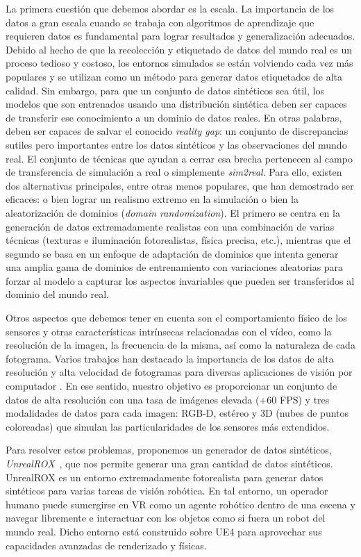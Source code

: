 La primera cuestión que debemos abordar es la escala. La importancia de los datos a gran escala cuando se trabaja con algoritmos de aprendizaje que requieren datos es fundamental para lograr resultados y generalización adecuados. Debido al hecho de que la recolección y etiquetado de datos del mundo real es un proceso tedioso y costoso, los entornos simulados se están volviendo cada vez más populares y se utilizan como un método para generar datos etiquetados de alta calidad. Sin embargo, para que un conjunto de datos sintéticos sea útil, los modelos que son entrenados usando una distribución sintética deben ser capaces de transferir ese conocimiento a un dominio de datos reales. En otras palabras, deben ser capaces de salvar el conocido \emph{reality gap}: un conjunto de discrepancias sutiles pero importantes entre los datos sintéticos y las observaciones del mundo real. El conjunto de técnicas que ayudan a cerrar esa brecha pertenecen al campo de transferencia de simulación a real o simplemente \emph{sim2real}. Para ello, existen dos alternativas principales, entre otras menos populares, que han demostrado ser eficaces: o bien lograr un realismo extremo en la simulación o bien la aleatorización de dominios (\emph{domain randomization}). El primero se centra en la generación de datos extremadamente realistas con una combinación de varias técnicas (texturas e iluminación fotorealistas, física precisa, etc.), mientras que el segundo se basa en un enfoque de adaptación de dominios que intenta generar una amplia gama de dominios de entrenamiento con variaciones aleatorias para forzar al modelo a capturar los aspectos invariables que pueden ser transferidos al dominio del mundo real. 

Otros aspectos que debemos tener en cuenta son el comportamiento físico de los sensores y otras características intrínsecas relacionadas con el vídeo, como la resolución de la imagen, la frecuencia de la misma, así como la naturaleza de cada fotograma. Varios trabajos han destacado la importancia de los datos de alta resolución y alta velocidad de fotogramas para diversas aplicaciones de visión por computador \cite{Handa2012}\cite{Held2016}. En ese sentido, nuestro objetivo es proporcionar un conjunto de datos de alta resolución con una tasa de imágenes elevada (+60 FPS) y tres modalidades de datos para cada imagen: RGB-D, estéreo y 3D (nubes de puntos coloreadas) que simulan las particularidades de los sensores más extendidos.

Para resolver estos problemas, proponemos un generador de datos sintéticos, \emph{UnrealROX}~\cite{Martinez-Gonzalez2018}, que nos permite generar una gran cantidad de datos sintéticos. UnrealROX es un entorno extremadamente fotorealista para generar datos sintéticos para varias tareas de visión robótica. En tal entorno, un operador humano puede sumergirse en \acl{VR} como un agente robótico dentro de una escena y navegar libremente e interactuar con los objetos como si fuera un robot del mundo real. Dicho entorno está construido sobre \ac{UE4} para aprovechar sus capacidades avanzadas de renderizado y físicas.

